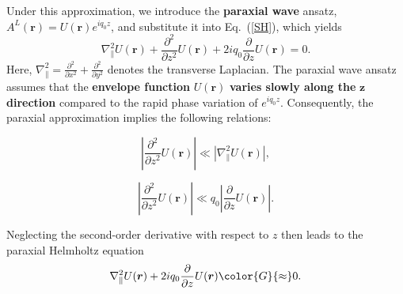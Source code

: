 Under this approximation, we introduce the \textbf{paraxial wave} ansatz, $A^L(\boldsymbol{r}) = U(\boldsymbol{r}) e^{iq_0 z}$, and substitute it into Eq.~(\ref{SH}), which yields 
\begin{equation}
\nabla^2_\parallel U(\boldsymbol{r})
+ \frac{\partial^2}{\partial z^2} U(\boldsymbol{r})
+ 2 i q_0 \frac{\partial}{\partial z} U(\boldsymbol{r}) = 0.
\end{equation}
Here, $\nabla^2_\parallel = \frac{\partial^2}{\partial x^2} + \frac{\partial^2}{\partial y^2}$ denotes the transverse Laplacian. The paraxial wave ansatz assumes that the \textbf{envelope function} $U(\boldsymbol{r})$ \textbf{varies slowly along the} $\boldsymbol{z}$ \textbf{direction} compared to the rapid phase variation of $e^{i q_0 z}$. Consequently, the paraxial approximation implies the following relations:

\begin{minipage}{0.48\textwidth}
    \begin{equation}
    \left| \frac{\partial^2}{\partial z^2} U(\boldsymbol{r}) \right|
    \ll
    \left| \nabla^2_\parallel U(\boldsymbol{r}) \right|,
    \label{paraxial1}
    \end{equation}
\end{minipage}
\hfill %
\begin{minipage}{0.48\textwidth}
    \begin{equation}
    \left| \frac{\partial^2}{\partial z^2} U(\boldsymbol{r}) \right|
    \ll
    q_0 \left| \frac{\partial}{\partial z} U(\boldsymbol{r}) \right|.
    \label{paraxial2}
    \end{equation}
\end{minipage}
\vspace{1.75\baselineskip} %
Neglecting the second-order derivative with respect to $z$ then leads to the paraxial Helmholtz equation
\begin{equation}
\nabla^2_\parallel U(\boldsymbol{r}) + 2 i q_0 \frac{\partial}{\partial z} U(\boldsymbol{r}) \color{G}{ \approx} 0.
\label{PHE}
\end{equation}

